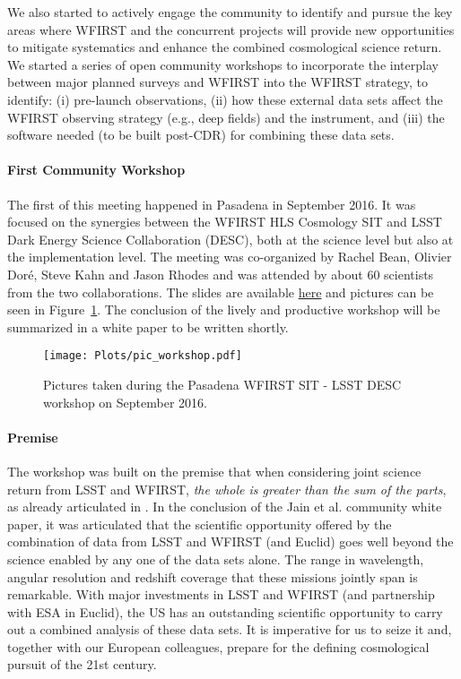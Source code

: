 
We also started to actively engage the community to identify and pursue the key areas
where WFIRST and the concurrent projects will provide new opportunities to
mitigate systematics and enhance the combined cosmological science return. We
started a series of open community workshops to incorporate the interplay
between major planned surveys and WFIRST into the WFIRST strategy, to identify:
(i) pre-launch observations, (ii) how these external data sets affect the WFIRST
observing strategy (e.g., deep fields) and the instrument, and (iii) the
software needed (to be built post-CDR) for combining these data sets.

\paragraph*{First Community Workshop} The first of this meeting happened in
Pasadena in September 2016. It was focused on the synergies between the WFIRST
HLS Cosmology SIT and LSST Dark Energy Science Collaboration (DESC), both at the
science level but also at the implementation level. The meeting was co-organized
by Rachel Bean, Olivier Dor\'e, Steve Kahn and Jason Rhodes and was attended by
about 60 scientists from the two collaborations. The slides are available
\href{https://conference.ipac.caltech.edu/wfirst_lsst/}{here} and pictures can
be seen in Figure~\ref{fig:pic_workshop}. The conclusion of the lively and
productive workshop will be summarized in a white paper to be written shortly.

\begin{figure}
\texttt{[image: Plots/pic\_workshop.pdf]}
\caption{\label{fig:pic_workshop}Pictures taken during the Pasadena WFIRST SIT - LSST DESC workshop on September 2016.}
\end{figure}

\paragraph*{Premise} The workshop was built on the premise that when considering
joint science return from LSST and WFIRST, \emph{the whole is greater than the
sum of the parts}, as already articulated in \citet{Jain:2015cpa}. In the
conclusion of the Jain et al. community white paper, it was articulated that the
scientific opportunity offered by the combination of data from LSST and WFIRST
(and Euclid) goes well beyond the science enabled by any one of the data sets
alone. The range in wavelength, angular resolution and redshift coverage that
these missions jointly span is remarkable. With major investments in LSST and
WFIRST (and partnership with ESA in Euclid), the US has an outstanding
scientific opportunity to carry out a combined analysis of these data sets. It
is imperative for us to seize it and, together with our European colleagues,
prepare for the defining cosmological pursuit of the 21st century.

